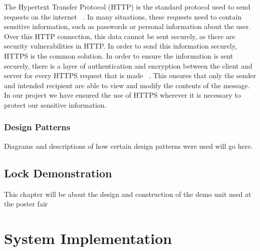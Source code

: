 \documentclass[12pt]{report}
\let\Oldsection\section
\renewcommand{\section}{\FloatBarrier\Oldsection}
\let\Oldsubsection\subsection
\renewcommand{\subsection}{\FloatBarrier\Oldsubsection}
\begin{document}
The Hypertext Transfer Protocol (HTTP) is the standard protocol used to send requests on the internet ~\autocite{HTTPREF}.
In many situations, these requests need to contain sensitive information, such as passwords or personal
information about the user. Over this HTTP connection, this data cannot be sent securely, as there are
security vulnerabilities in HTTP. In order to send this information securely, HTTPS is the common
solution. In order to ensure the information is sent securely, there is a layer of authentication
and encryption between the client and server for every HTTPS request that is made ~\autocite{HTTPSVSHTTP}. This ensures that
only the sender and intended recipient are able to view and modify the contents of the message. In our
project we have ensured the use of HTTPS wherever it is necessary to protect our sensitive information.


\subsection{Design Patterns} \label{design-patterns}



Diagrams and descriptions of how certain design patterns were used will go here.



\section{Lock Demonstration} \label{lock-demonstration}

This chapter will be about the design and construction of the demo unit used at the poster fair


\chapter{System Implementation} \label{system-implementation}
\end{document}
